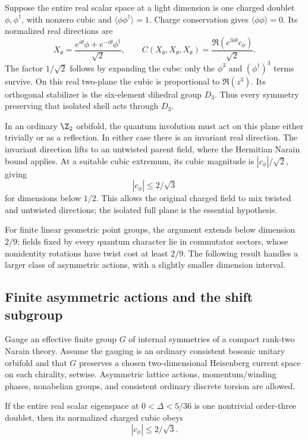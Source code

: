 Suppose the entire real scalar space at a light dimension is one
charged doublet $\phi,\phi^\dagger$, with nonzero cubic and
$\langle\phi\phi^\dagger\rangle=1$. Charge conservation gives
$\langle\phi\phi\rangle=0$. Its normalized real directions are
\[
 X_\theta=\frac{e^{i\theta}\phi+e^{-i\theta}\phi^\dagger}{\sqrt2},
 \qquad C(X_\theta,X_\theta,X_\theta)
 =\frac{\Re(e^{3i\theta}c_\phi)}{\sqrt2}.
\]
The factor $1/\sqrt2$ follows by expanding the cube: only the
$\phi^3$ and $(\phi^\dagger)^3$ terms survive. On this real
two-plane the cubic is proportional to $\Re(z^3)$. Its orthogonal
stabilizer is the six-element dihedral group $D_3$. Thus every
symmetry preserving that isolated shell acts through $D_3$.

In an ordinary $\Z_2$ orbifold, the quantum involution must act on
this plane either trivially or as a reflection. In either case there
is an invariant real direction. The invariant direction lifts to
an untwisted parent field, where the Hermitian Narain bound applies.
At a suitable cubic extremum, its cubic magnitude is
$|c_\phi|/\sqrt2$, giving
\[
 |c_\phi|\leq2/\sqrt3
\]
for dimensions below $1/2$. This allows the original charged field
to mix twisted and untwisted directions; the isolated full plane is
the essential hypothesis.

For finite linear geometric point groups, the argument extends
below dimension $2/9$: fields fixed by every quantum character
lie in commutator sectors, whose nonidentity rotations have twist
cost at least $2/9$. The following result handles a larger class
of asymmetric actions, with a slightly smaller dimension interval.

\subsection{Finite asymmetric actions and the shift subgroup}

\begin{proposition}
\label{prop:asymmetric-doublet}
Gauge an effective finite group $G$ of internal symmetries of a
compact rank-two Narain theory. Assume the gauging is an ordinary
consistent bosonic unitary orbifold and that $G$ preserves a chosen
two-dimensional Heisenberg current space on each chirality, setwise.
Asymmetric lattice actions, momentum/winding phases, nonabelian
groups, and consistent ordinary discrete torsion are allowed.

If the entire real scalar eigenspace at
$0<\Delta<5/36$ is one nontrivial order-three doublet, then its
normalized charged cubic obeys
\[
 |c_\phi|\leq2/\sqrt3.
\]
\end{proposition}


